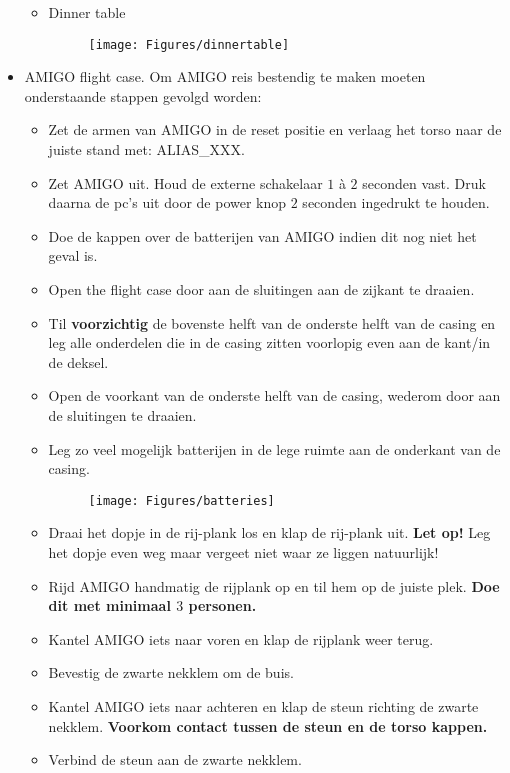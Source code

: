 \documentclass[a4paper,10pt]{article}
\numberwithin{equation}{section}
\numberwithin{figure}{section}
\numberwithin{table}{section}
\begin{document}
\begin{itemize}
\begin{itemize}
			\item Dinner table
				\begin{figure}[H]
					\centering
					\texttt{[image: Figures/dinnertable]}
				\end{figure}		
		\end{itemize}
	\item AMIGO flight case. Om AMIGO reis bestendig te maken moeten onderstaande stappen gevolgd worden:
		\begin{itemize}
		\item Zet de armen van AMIGO in de reset positie en verlaag het torso naar de juiste stand met: ALIAS\_XXX.
        \item Zet AMIGO uit. Houd de externe schakelaar $1$ \`a $2$ seconden vast. Druk daarna de pc's uit door de power knop $2$ seconden ingedrukt te houden.
		\item Doe de kappen over de batterijen van AMIGO indien dit nog niet het geval is.
		\item Open the flight case door aan de sluitingen aan de zijkant te draaien.
		\item Til \textbf{voorzichtig} de bovenste helft van de onderste helft van de casing en leg alle onderdelen die in de casing zitten voorlopig even aan de kant/in de deksel.
		\item Open de voorkant van de onderste helft van de casing, wederom door aan de sluitingen te draaien.
		\item Leg zo veel mogelijk batterijen in de lege ruimte aan de onderkant van de casing.
		\begin{figure}[H]
			\centering
			\texttt{[image: Figures/batteries]}
		\end{figure}
		\item Draai het dopje in de rij-plank los en klap de rij-plank uit. \textbf{Let op!} Leg het dopje even weg maar vergeet niet waar ze liggen natuurlijk!
		\item Rijd AMIGO handmatig de rijplank op en til hem op de juiste plek. \textbf{Doe dit met minimaal $3$ personen.}
        \item Kantel AMIGO iets naar voren en klap de rijplank weer terug.
        \item Bevestig de zwarte nekklem om de buis.
        \item Kantel AMIGO iets naar achteren en klap de steun richting de zwarte nekklem. \textbf{Voorkom contact tussen de steun en de torso kappen.}
		\item Verbind de steun aan de zwarte nekklem.

\end{itemize}
\end{itemize}
\end{document}
